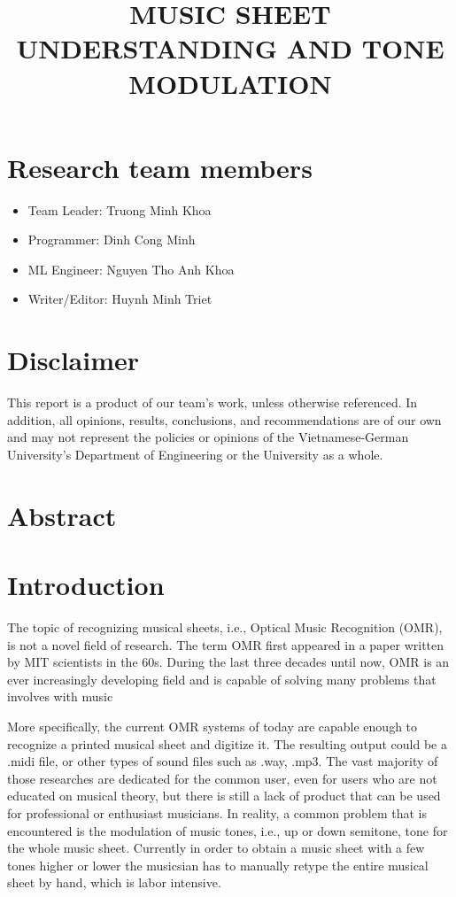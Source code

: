 \documentclass[a4paper,12pt]{report}
\title{ MUSIC SHEET UNDERSTANDING AND TONE MODULATION}
\author{}
\begin{document}
\afterpage{\null\newpage}

\maketitle

\tableofcontents

\clearpage

\section{Research team members}
\begin{itemize}
	\item Team Leader:      \hfill Truong Minh Khoa
	\item Programmer: 		\hfill Dinh Cong Minh
	\item ML Engineer:		\hfill Nguyen Tho Anh Khoa
	\item Writer/Editor:	\hfill Huynh Minh Triet
\end{itemize}


\section{Disclaimer} 
This report is a product of our team's work, unless otherwise referenced. In
addition, all opinions, results, conclusions, and recommendations are of our own
and may not represent the policies or opinions of the Vietnamese-German
University's Department of Engineering or the University as a whole. 

\clearpage

\section{Abstract}

\section{Introduction}

The topic of recognizing musical sheets, i.e., Optical Music Recognition (OMR),
is not a novel field of research. The term OMR first appeared in a paper written
by MIT scientists in the 60s.  During the last three decades until now, OMR is
an ever increasingly developing field and is capable of solving many problems
that involves with music

More specifically, the current OMR systems of today are capable enough to
recognize a printed musical sheet and digitize it. The resulting output could be
a .midi file, or other types of sound files such as .way, .mp3. The vast
majority of those researches are dedicated for the common user, even for users
who are not educated on musical theory, but there is still a lack of product
that can be used for professional or enthusiast musicians. In reality, a common
problem that is encountered is the modulation of music tones, i.e., up or down
semitone, tone for the whole music sheet. Currently in order to obtain a music
sheet with a few tones higher or lower the musicsian has to manually retype the
entire musical sheet by hand, which is labor intensive.
\end{document}
